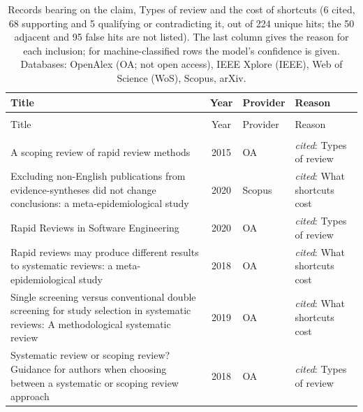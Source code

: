 
\begingroup\footnotesize
\begin{longtable}{@{}%
  >{\raggedright\arraybackslash}p{}c%
  >{\raggedright\arraybackslash}p{}%
  >{\raggedright\arraybackslash}p{}@{}}
\caption{Records bearing on the claim, Types of review and the cost of shortcuts (6 cited, 68 supporting and 5 qualifying or contradicting it, out of 224 unique hits; the 50 adjacent and 95 false hits are not listed). The last column gives the reason for each inclusion; for machine-classified rows the model's confidence is given. Databases: OpenAlex (OA; not open access), IEEE Xplore (IEEE), Web of Science (WoS), Scopus, arXiv.}\label{tab:hits-method}\\
\toprule
Title & Year & Provider & Reason \\
\midrule
\endfirsthead
\multicolumn{4}{@{}l}{\emph{\tablename~\thetable{} (cont.)}}\\
\toprule
Title & Year & Provider & Reason \\
\midrule
\endhead
\midrule \multicolumn{4}{r@{}}{\emph{continued on next page}}\\
\endfoot
\bottomrule
\endlastfoot
A scoping review of rapid review methods & 2015 & OA & \emph{cited}: Types of review \\
Excluding non-English publications from evidence-syntheses did not change conclusions: a meta-epidemiological study & 2020 & Scopus & \emph{cited}: What shortcuts cost \\
Rapid Reviews in Software Engineering & 2020 & OA & \emph{cited}: Types of review \\
Rapid reviews may produce different results to systematic reviews: a meta-epidemiological study & 2018 & OA & \emph{cited}: What shortcuts cost \\
Single screening versus conventional double screening for study selection in systematic reviews: A methodological systematic review & 2019 & OA & \emph{cited}: What shortcuts cost \\
Systematic review or scoping review? Guidance for authors when choosing between a systematic or scoping review approach & 2018 & OA & \emph{cited}: Types of review \\

\end{longtable}
